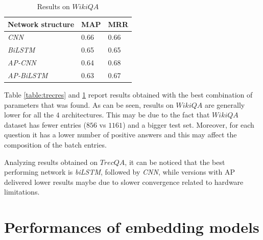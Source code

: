 \documentclass[11pt,a4paper]{article}
\begin{document}
\begin{table}[h]
\begin{center}
\begin{tabular}{|l|l|l|}
\hline \bf Network structure & \bf MAP & \bf MRR \\ \hline
\textit{CNN} & 0.66 & 0.66  \\
\textit{BiLSTM} & 0.65 & 0.65  \\
\textit{AP-CNN} & 0.64 & 0.68  \\
\textit{AP-BiLSTM} & 0.63 & 0.67 \\
\hline
\end{tabular}
\end{center}
\caption{Results on $WikiQA$}
\label{table:wikires}
\end{table}

Table \ref{table:trecres} and \ref{table:wikires} report results obtained with the best combination of parameters that was found. As can be seen, results on $WikiQA$ are generally lower for all the $4$ architectures. This may be due to the fact that $WikiQA$ dataset has fewer entries ($856$ vs $1161$) and a bigger test set. Moreover, for each question it has a lower number of positive answers and this may affect the composition of the batch entries.

Analyzing results obtained on $TrecQA$, it can be noticed that the best performing network is \textit{biLSTM}, followed by \textit{CNN}, while versions with AP delivered lower results maybe due to slower convergence related to hardware limitations.

\section{Performances of embedding models}
\end{document}
